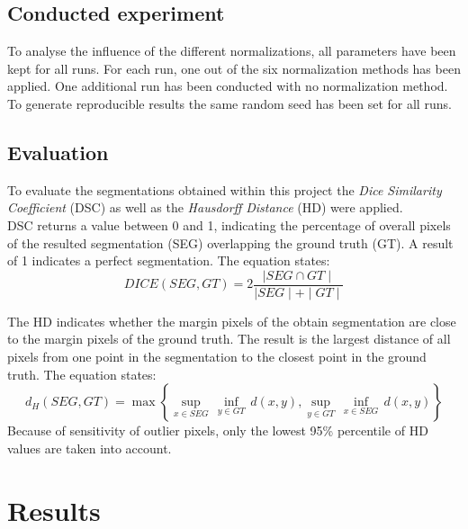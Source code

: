 \documentclass[journal]{IEEEtran}
\begin{document}
	
\subsection{Conducted experiment}
	To analyse the influence of the different normalizations, all parameters have been kept for all runs. 
	For each run, one out of the six normalization methods has been applied. One additional run has been conducted with no normalization method.
	To generate reproducible results the same random seed has been set for all runs.  
	
\subsection{Evaluation}
	To evaluate the segmentations obtained within this project the {\itshape Dice Similarity Coefficient} (DSC) as well as the {\itshape Hausdorff Distance} (HD) were applied.\\
	DSC returns a value between 0 and 1, indicating the percentage of overall pixels of the resulted segmentation (SEG) overlapping the ground truth (GT). 
	A result of 1 indicates a perfect segmentation. The equation states: 
	\begin{equation}
		DICE(SEG, GT) = 2 \frac{\mid SEG \cap GT \mid}{\mid SEG \mid + \mid GT \mid}
	\end{equation}

	The HD indicates whether the margin pixels of the obtain segmentation are close to the margin pixels of the ground truth. 
	The result is the largest distance of all pixels from one point in the segmentation to the closest point in the ground truth.
	The equation states:
	\begin{equation}
			d_H (SEG, GT) = \max \left\{ \underset{x\in SEG}{\mathop{\sup }}\,\underset{y\in GT}{\mathop{\inf }}\,d(x,y),\underset{y\in GT}{\mathop{\sup }}\,\underset{x\in SEG}{\mathop{\inf }}\,d(x,y) \right\}
	\end{equation}
	Because of sensitivity of outlier pixels, only the lowest 95\% percentile of HD values are taken into account.

	


\section{Results}
\end{document}
